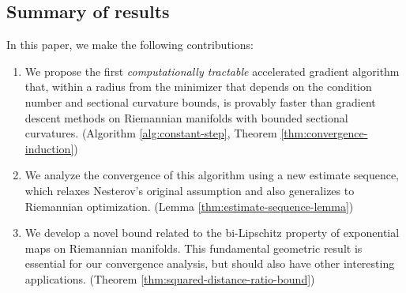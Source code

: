 




\subsection{Summary of results}
In this paper, we make the following contributions:
\begin{enumerate}
	\item We propose the first \emph{computationally tractable} accelerated gradient algorithm that, within a radius from the minimizer that depends on the condition number and sectional curvature bounds, is provably faster than gradient descent methods on Riemannian manifolds with bounded sectional curvatures. (Algorithm \ref{alg:constant-step}, Theorem \ref{thm:convergence-induction})
	\item We analyze the convergence of this algorithm using a new estimate sequence, which relaxes Nesterov's original assumption and also generalizes to Riemannian optimization. (Lemma \ref{thm:estimate-sequence-lemma})
	\item We develop a novel bound related to the bi-Lipschitz property of exponential maps on Riemannian manifolds. This fundamental geometric result is essential for our convergence analysis, but should also have other interesting applications. (Theorem \ref{thm:squared-distance-ratio-bound}) 
\end{enumerate}


